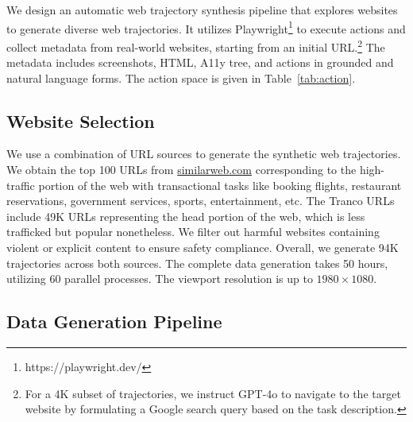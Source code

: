 



We design an automatic web trajectory synthesis pipeline that explores websites to generate diverse web trajectories.
It utilizes Playwright\footnote{https://playwright.dev/} to execute actions and collect metadata from real-world websites, starting from an initial URL.\footnote{For a 4K subset of trajectories, we instruct GPT-4o to navigate to the target website by formulating a Google search query based on the task description.}
The metadata includes screenshots, HTML,  A11y tree, and actions in grounded and natural language forms.
The action space is given in Table~\ref{tab:action}.

\subsection{Website Selection}
We use a combination of URL sources to generate the synthetic web trajectories.
We obtain the top 100 URLs from \url{similarweb.com} corresponding to the high-traffic portion of the web with transactional tasks like booking flights, restaurant reservations, government services, sports, entertainment, etc.
The Tranco \cite{DBLP:conf/ndss/PochatGTKJ19} URLs include 49K URLs representing the head portion of the web, which is less trafficked but popular nonetheless.
We filter out harmful websites containing violent or explicit content to ensure safety compliance.
Overall, we generate 94K trajectories across both sources.
The complete data generation takes 50 hours, utilizing 60 parallel processes.
The viewport resolution is up to $1980\times1080$.















\subsection{Data Generation Pipeline}


